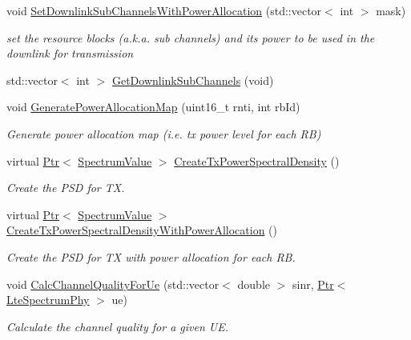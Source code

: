 \begin{DoxyCompactItemize}
void \hyperlink{classns3_1_1LteEnbPhy_aa406551fba9c78d2df606ee8ea753561}{Set\+Downlink\+Sub\+Channels\+With\+Power\+Allocation} (std\+::vector$<$ int $>$ mask)
\begin{DoxyCompactList}\small\item\em set the resource blocks (a.\+k.\+a. sub channels) and its power to be used in the downlink for transmission \end{DoxyCompactList}\item 
std\+::vector$<$ int $>$ \hyperlink{classns3_1_1LteEnbPhy_a99bffb91169ac7f39c27e3dc15a5ddc8}{Get\+Downlink\+Sub\+Channels} (void)
\item 
void \hyperlink{classns3_1_1LteEnbPhy_a945fdbbd3252b1e7acd7abf830692157}{Generate\+Power\+Allocation\+Map} (uint16\+\_\+t rnti, int rb\+Id)
\begin{DoxyCompactList}\small\item\em Generate power allocation map (i.\+e. tx power level for each RB) \end{DoxyCompactList}\item 
virtual \hyperlink{classns3_1_1Ptr}{Ptr}$<$ \hyperlink{classns3_1_1SpectrumValue}{Spectrum\+Value} $>$ \hyperlink{classns3_1_1LteEnbPhy_ab8247c37a1c9b9f76a69886fe430a4cd}{Create\+Tx\+Power\+Spectral\+Density} ()
\begin{DoxyCompactList}\small\item\em Create the P\+SD for TX. \end{DoxyCompactList}\item 
virtual \hyperlink{classns3_1_1Ptr}{Ptr}$<$ \hyperlink{classns3_1_1SpectrumValue}{Spectrum\+Value} $>$ \hyperlink{classns3_1_1LteEnbPhy_abca51ffb8d7134394e4f7c9bd3a171b4}{Create\+Tx\+Power\+Spectral\+Density\+With\+Power\+Allocation} ()
\begin{DoxyCompactList}\small\item\em Create the P\+SD for TX with power allocation for each RB. \end{DoxyCompactList}\item 
void \hyperlink{classns3_1_1LteEnbPhy_a80b1e762212395771b51eaa50461c8c7}{Calc\+Channel\+Quality\+For\+Ue} (std\+::vector$<$ double $>$ sinr, \hyperlink{classns3_1_1Ptr}{Ptr}$<$ \hyperlink{classns3_1_1LteSpectrumPhy}{Lte\+Spectrum\+Phy} $>$ ue)
\begin{DoxyCompactList}\small\item\em Calculate the channel quality for a given UE. \end{DoxyCompactList}\item 

\end{DoxyCompactItemize}
